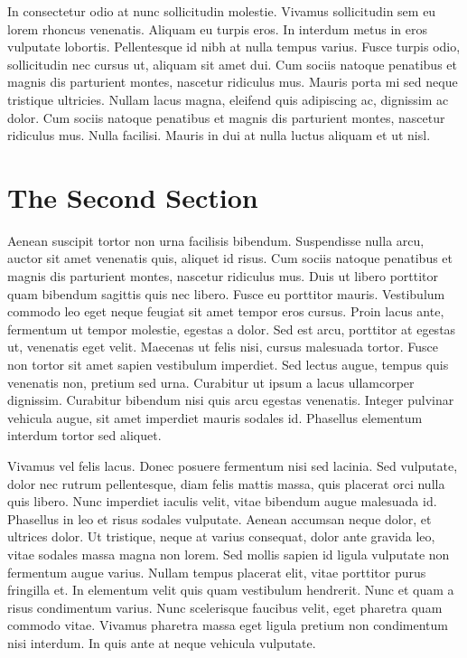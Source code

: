 In consectetur odio at nunc sollicitudin molestie. Vivamus sollicitudin sem eu lorem rhoncus venenatis. Aliquam eu turpis eros. In interdum metus in eros vulputate lobortis. Pellentesque id nibh at nulla tempus varius. Fusce turpis odio, sollicitudin nec cursus ut, aliquam sit amet dui. Cum sociis natoque penatibus et magnis dis parturient montes, nascetur ridiculus mus. Mauris porta mi sed neque tristique ultricies. Nullam lacus magna, eleifend quis adipiscing ac, dignissim ac dolor. Cum sociis natoque penatibus et magnis dis parturient montes, nascetur ridiculus mus. Nulla facilisi. Mauris in dui at nulla luctus aliquam et ut nisl. 

\section{The Second Section}

Aenean suscipit tortor non urna facilisis bibendum. Suspendisse nulla arcu, auctor sit amet venenatis quis, aliquet id risus. Cum sociis natoque penatibus et magnis dis parturient montes, nascetur ridiculus mus. Duis ut libero porttitor quam bibendum sagittis quis nec libero. Fusce eu porttitor mauris. Vestibulum commodo leo eget neque feugiat sit amet tempor eros cursus. Proin lacus ante, fermentum ut tempor molestie, egestas a dolor. Sed est arcu, porttitor at egestas ut, venenatis eget velit. Maecenas ut felis nisi, cursus malesuada tortor. Fusce non tortor sit amet sapien vestibulum imperdiet. Sed lectus augue, tempus quis venenatis non, pretium sed urna. Curabitur ut ipsum a lacus ullamcorper dignissim. Curabitur bibendum nisi quis arcu egestas venenatis. Integer pulvinar vehicula augue, sit amet imperdiet mauris sodales id. Phasellus elementum interdum tortor sed aliquet. 


Vivamus vel felis lacus. Donec posuere fermentum nisi sed lacinia. Sed vulputate, dolor nec rutrum pellentesque, diam felis mattis massa, quis placerat orci nulla quis libero. Nunc imperdiet iaculis velit, vitae bibendum augue malesuada id. Phasellus in leo et risus sodales vulputate. Aenean accumsan neque dolor, et ultrices dolor. Ut tristique, neque at varius consequat, dolor ante gravida leo, vitae sodales massa magna non lorem. Sed mollis sapien id ligula vulputate non fermentum augue varius. Nullam tempus placerat elit, vitae porttitor purus fringilla et. In elementum velit quis quam vestibulum hendrerit. Nunc et quam a risus condimentum varius. Nunc scelerisque faucibus velit, eget pharetra quam commodo vitae. Vivamus pharetra massa eget ligula pretium non condimentum nisi interdum. In quis ante at neque vehicula vulputate. 



